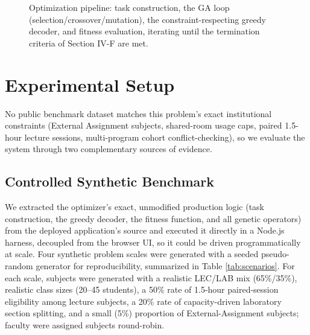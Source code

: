 \documentclass[conference]{IEEEtran}
\begin{document}
\begin{figure}[t]
\centering
{}
\caption{Optimization pipeline: task construction, the GA loop (selection/crossover/mutation), the constraint-respecting greedy decoder, and fitness evaluation, iterating until the termination criteria of Section IV-F are met.}
\label{fig:pipeline}
\end{figure}

\section{Experimental Setup}

No public benchmark dataset matches this problem's exact institutional constraints (External Assignment subjects, shared-room usage caps, paired 1.5-hour lecture sessions, multi-program cohort conflict-checking), so we evaluate the system through two complementary sources of evidence.

\subsection{Controlled Synthetic Benchmark}
We extracted the optimizer's exact, unmodified production logic (task construction, the greedy decoder, the fitness function, and all genetic operators) from the deployed application's source and executed it directly in a Node.js harness, decoupled from the browser UI, so it could be driven programmatically at scale. Four synthetic problem scales were generated with a seeded pseudo-random generator for reproducibility, summarized in Table \ref{tab:scenarios}. For each scale, subjects were generated with a realistic LEC/LAB mix (65\%/35\%), realistic class sizes (20--45 students), a 50\% rate of 1.5-hour paired-session eligibility among lecture subjects, a 20\% rate of capacity-driven laboratory section splitting, and a small (5\%) proportion of External-Assignment subjects; faculty were assigned subjects round-robin.
\end{document}
